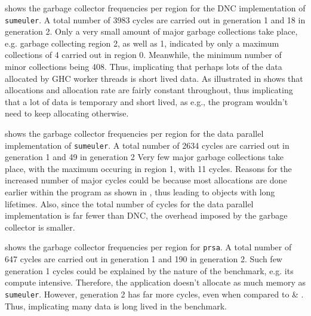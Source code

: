 \documentclass{paper}\usepackage{graphicx}
\begin{document}
 shows the garbage collector frequencies per region for the DNC implementation of \lstinline{sumeuler}. A total number of 3983 cycles are carried out in generation 1 and 18 in generation 2. Only a very small amount of major garbage collections take place, e.g. garbage collecting region 2, as well as 1, indicated by only a maximum collections of 4 carried out in region 0. Meanwhile, the minimum number of minor collections being 408. Thus, implicating that perhaps lots of the data allocated by GHC worker threads is short lived data. As illustrated in  shows that allocations and allocation rate are fairly constant throughout, thus implicating that a lot of data is temporary and short lived, as e.g., the program wouldn't need to keep allocating otherwise.

 shows the garbage collector frequencies per region for the data parallel implementation of \lstinline{sumeuler}. A total number of 2634 cycles are carried out in generation 1 and 49 in generation 2 Very few major garbage collections take place, with the maximum occuring in region 1, with 11 cycles. Reasons for the increased number of  major cycles could be because most allocations are done earlier within the program as shown in , thus leading to objects with long lifetimes. Also, since the total number of cycles for the data parallel implementation is far fewer than DNC, the overhead imposed by the garbage collector is smaller.

 shows the garbage collector frequencies per region for \lstinline{prsa}. A total number of 647 cycles are carried out in generation 1 and 190 in generation 2. Such few generation 1 cycles could be explained by the nature of the benchmark, e.g. its compute intensive. Therefore, the application doesn't allocate as much memory as \lstinline{sumeuler}. However, generation 2 has far more cycles, even when compared to  \& . Thus, implicating many data is long lived in the benchmark.

\begin{table}[!htb]
  \centering
  \caption{Garbage Collection frequencies per region for the DNC implementation of \lstinline{sumeuler}. Measured by extensions to GHC GC.}
  \label{table:dnc_freq}
\end{table}
\end{document}

